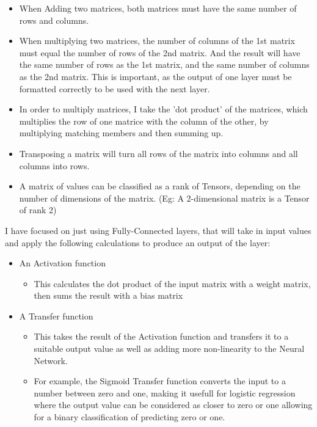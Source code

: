 \documentclass[./project-report/src/latex/project-report.tex]{subfiles}
\begin{document}
\begin{itemize}
    \item When Adding two matrices, both matrices must have the same number of rows and columns.
    \item When multiplying two matrices, the number of columns of the 1st matrix must equal the number of rows of the 2nd matrix. And the result will have the same 
          number of rows as the 1st matrix, and the same number of columns as the 2nd matrix. This is important, as the output of one layer must be formatted correctly 
          to be used with the next layer.
    \item In order to multiply matrices, I take the 'dot product' of the matrices, which multiplies the row of one matrice with the column of the other, by multiplying 
          matching members and then summing up.
    \item Transposing a matrix will turn all rows of the matrix into columns and all columns into rows.
    \item A matrix of values can be classified as a rank of Tensors, depending on the number of dimensions of the matrix. (Eg: A 2-dimensional matrix is a Tensor of 
          rank 2)
\end{itemize}

I have focused on just using Fully-Connected layers, that will take in input values and apply the following calculations to produce an output of the layer:

\begin{itemize}
    \item An Activation function
    \begin{itemize}
        \item This calculates the dot product of the input matrix with a weight matrix, then sums the result with a bias matrix
    \end{itemize}
    \item A Transfer function
    \begin{itemize}
        \item This takes the result of the Activation function and transfers it to a suitable output value as well as adding more non-linearity to the Neural Network.
        \item For example, the Sigmoid Transfer function converts the input to a number between zero and one, making it usefull for logistic regression where the output 
              value can be considered as closer to zero or one allowing for a binary classification of predicting zero or one.
    \end{itemize}
\end{itemize}
\vspace{5mm}
\end{document}
